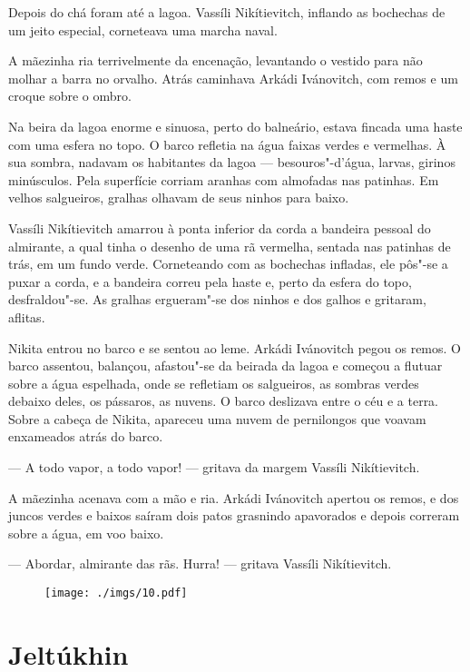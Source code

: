 Depois do chá foram até a lagoa. Vassíli Nikítievitch, inflando as
bochechas de um jeito especial, corneteava uma marcha naval.

A mãezinha ria terrivelmente da encenação, levantando o vestido para não
molhar a barra no orvalho. Atrás caminhava Arkádi Ivánovitch, com remos
e um croque sobre o ombro.

Na beira da lagoa enorme e sinuosa, perto do balneário, estava fincada
uma haste com uma esfera no topo. O barco refletia na água faixas verdes
e vermelhas. À sua sombra, nadavam os habitantes da lagoa ---
besouros"-d'água, larvas, girinos minúsculos. Pela superfície corriam
aranhas com almofadas nas patinhas. Em velhos salgueiros, gralhas
olhavam de seus ninhos para baixo.

Vassíli Nikítievitch amarrou à ponta inferior da corda a bandeira
pessoal do almirante, a qual tinha o desenho de uma rã vermelha, sentada
nas patinhas de trás, em um fundo verde. Corneteando com as bochechas
infladas, ele pôs"-se a puxar a corda, e a bandeira correu pela haste e,
perto da esfera do topo, desfraldou"-se. As gralhas ergueram"-se dos ninhos
e dos galhos e gritaram, aflitas.

Nikita entrou no barco e se sentou ao leme. Arkádi Ivánovitch pegou os
remos. O barco assentou, balançou, afastou"-se da beirada da lagoa e
começou a flutuar sobre a água espelhada, onde se refletiam os
salgueiros, as sombras verdes debaixo deles, os pássaros, as nuvens. O
barco deslizava entre o céu e a terra. Sobre a cabeça de Nikita,
apareceu uma nuvem de pernilongos que voavam enxameados atrás do barco.

--- A todo vapor, a todo vapor! --- gritava da margem Vassíli
Nikítievitch.

A mãezinha acenava com a mão e ria. Arkádi Ivánovitch apertou os remos,
e dos juncos verdes e baixos saíram dois patos grasnindo apavorados e
depois correram sobre a água, em voo baixo.

--- Abordar, almirante das rãs. Hurra! --- gritava Vassíli Nikítievitch.

\begin{figure}
\vspace*{-2.65cm}
\hspace*{-2.85cm}\texttt{[image: ./imgs/10.pdf]}
\end{figure}

\chapter{Jeltúkhin}

